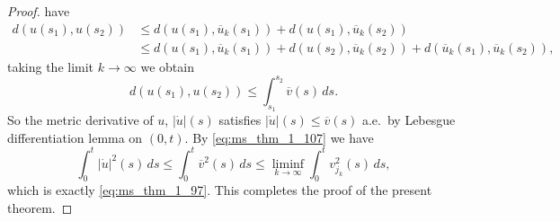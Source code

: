 \documentclass[a4paper,11pt, leqno]{scrreprt} %
\renewcommand{\leq}{\leqslant}
\renewcommand{\leq}{\leqslant}
\theoremstyle{change}
\theoremstyle{nonumberplain}
\newtheorem{proof}{Proof}
\begin{document}
\begin{proof}
  have
  \begin{equation}
    \label{eq:ms_thm_1_109}
    \begin{split}
      d(u(s_1), u(s_2)) &\leq d(u(s_1), \overline u_k(s_1)) +
      d(u(s_1), \overline u_k(s_2))\\
      &\leq d(u(s_1), \overline u_k(s_1)) + d(u(s_2), \overline
      u_k(s_2)) + d(\overline u_k(s_1), \overline u_k(s_2)),
    \end{split}
  \end{equation}
  taking the limit $k \to \infty$ we obtain
  \begin{equation}
    \label{eq:ms_thm_1_110}
    d(u(s_1), u(s_2)) \leq \int_{s_1}^{s_2} \overline v(s) \, ds.
  \end{equation}
  So the metric derivative of $u$, $|\dot u|(s)$ satisfies $|\dot
  u|(s) \leq \overline v(s)$ a.e.\ by Lebesgue differentiation lemma
  on $(0, t)$. By \eqref{eq:ms_thm_1_107} we have
  \begin{equation}
    \label{eq:ms_thm_1_108}
    \int_0^t |\dot u|^2(s) \, ds \leq \int_0^t \overline v^2(s) \, ds
    \leq \liminf_{k \to \infty} \int_0^t v_{j_k}^2(s) \, ds,
  \end{equation}
  which is exactly \eqref{eq:ms_thm_1_97}. This completes the proof of
  the present theorem.
\end{proof}
\end{document}
